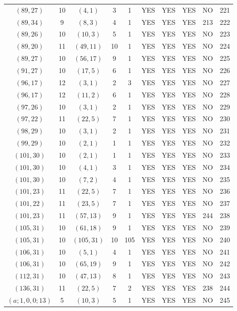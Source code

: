 \begin{longtable}{|c|c|c|c|c|c|c|c|c|c|}
$(89, 27)$ & 10 & $(4, 1)$ & 3 & 1 & YES & YES & YES & NO & 221\\
$(89, 34)$ & 9 & $(8, 3)$ & 4 & 1 & YES & YES & YES & 213 & 222\\
$(89, 26)$ & 10 & $(10, 3)$ & 5 & 1 & YES & YES & YES & NO & 223\\
$(89, 20)$ & 11 & $(49, 11)$ & 10 & 1 & YES & YES & YES & NO & 224\\
$(89, 27)$ & 10 & $(56, 17)$ & 9 & 1 & YES & YES & YES & NO & 225\\
$(91, 27)$ & 10 & $(17, 5)$ & 6 & 1 & YES & YES & YES & NO & 226\\
$(96, 17)$ & 12 & $(3, 1)$ & 2 & 3 & YES & YES & YES & NO & 227\\
$(96, 17)$ & 12 & $(11, 2)$ & 6 & 1 & YES & YES & YES & NO & 228\\
$(97, 26)$ & 10 & $(3, 1)$ & 2 & 1 & YES & YES & YES & NO & 229\\
$(97, 22)$ & 11 & $(22, 5)$ & 7 & 1 & YES & YES & YES & NO & 230\\
$(98, 29)$ & 10 & $(3, 1)$ & 2 & 1 & YES & YES & YES & NO & 231\\
$(99, 29)$ & 10 & $(2, 1)$ & 1 & 1 & YES & YES & YES & NO & 232\\
$(101, 30)$ & 10 & $(2, 1)$ & 1 & 1 & YES & YES & YES & NO & 233\\
$(101, 30)$ & 10 & $(4, 1)$ & 3 & 1 & YES & YES & YES & NO & 234\\
$(101, 30)$ & 10 & $(7, 2)$ & 4 & 1 & YES & YES & YES & NO & 235\\
$(101, 23)$ & 11 & $(22, 5)$ & 7 & 1 & YES & YES & YES & NO & 236\\
$(101, 22)$ & 11 & $(23, 5)$ & 7 & 1 & YES & YES & YES & NO & 237\\
$(101, 23)$ & 11 & $(57, 13)$ & 9 & 1 & YES & YES & YES & 244 & 238\\
$(105, 31)$ & 10 & $(61, 18)$ & 9 & 1 & YES & YES & YES & NO & 239\\
$(105, 31)$ & 10 & $(105, 31)$ & 10 & 105 & YES & YES & YES & NO & 240\\
$(106, 31)$ & 10 & $(5, 1)$ & 4 & 1 & YES & YES & YES & NO & 241\\
$(106, 31)$ & 10 & $(65, 19)$ & 9 & 1 & YES & YES & YES & NO & 242\\
$(112, 31)$ & 10 & $(47, 13)$ & 8 & 1 & YES & YES & YES & NO & 243\\
$(136, 31)$ & 11 & $(22, 5)$ & 7 & 2 & YES & YES & YES & 238 & 244\\
$(a; 1, 0, 0; 13)$ & 5 & $(10, 3)$ & 5 & 1 & YES & YES & YES & NO & 245\\

\end{longtable}
